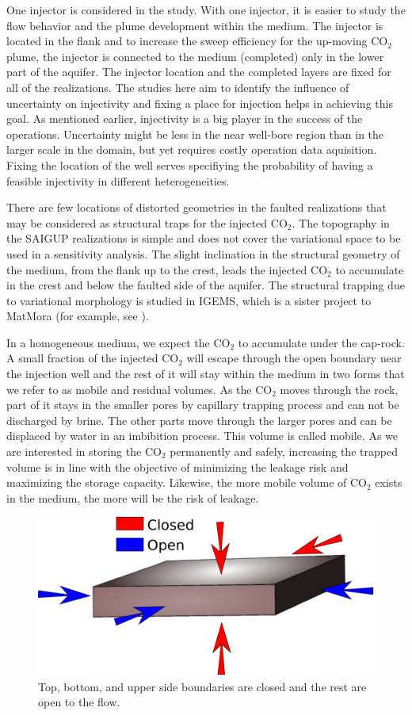 One injector is considered in the study. With one injector, it is easier to
study the flow behavior and the plume development within the medium. The
injector is
located in the flank and to increase the sweep efficiency for the
up-moving $\mbox{CO}_2$ plume, the injector is connected to the medium (completed) only in the lower part
of
the aquifer. The injector location and the completed layers are fixed for all of
the realizations. The studies here aim to identify the influence of uncertainty
on injectivity and fixing a place for injection helps in achieving this goal. As mentioned earlier, injectivity is a big player in the success of the operations. Uncertainty might be less in the near well-bore region than in the larger scale in the domain, but yet requires costly operation data aquisition. Fixing the location of the well serves specifiying the probability of having a feasible injectivity in different heterogeneities.

There are few locations of distorted geometries in the faulted realizations that
may be considered as structural traps for the injected $\mbox{CO}_2$. The
topography in the SAIGUP realizations is simple and does not cover the
variational space to be used in a sensitivity analysis. The slight inclination
in the structural geometry of the medium, from the flank up to the crest, leads
the injected $\mbox{CO}_2$  to accumulate in the crest and below the faulted
side of the aquifer. The structural trapping due to variational morphology is
studied in IGEMS, which is a sister project to MatMora (for example, see
\cite{syversveenstudy}). 

In a homogeneous medium, we expect the $\mbox{CO}_2$ to accumulate under the
cap-rock. A small fraction of the injected $\mbox{CO}_2$ will escape through the
open boundary near the injection well and the rest of it will stay within the
medium in two forms that we refer to as  mobile and residual volumes. As
the $\mbox{CO}_2$ moves through the rock, part of it stays in the smaller pores
by capillary trapping process and can not be discharged by brine. The other
parts move through the larger pores and can be displaced by water in an
imbibition process. This volume is called mobile. As we are interested in
storing the $\mbox{CO}_2$ permanently and safely, increasing the trapped volume
is in line with the objective of minimizing the leakage risk and maximizing the
storage capacity. Likewise, the more mobile volume of $\mbox{CO}_2$ exists in
the medium, the more will be the risk of leakage. 

\begin{figure}
 \centering{}
 \includegraphics[width=0.6\linewidth]{./figurer/boundaries.pdf}
 \caption{Top, bottom, and upper side boundaries are closed and the rest
are open to the flow.}
 \label{fig:BDRY}
\end{figure}

